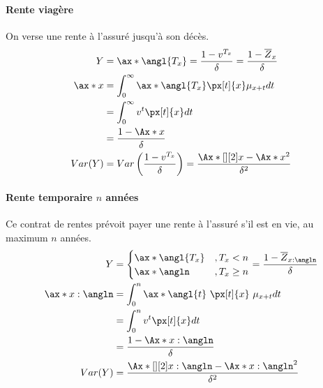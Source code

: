 \documentclass[10pt, french]{article}
\begin{document}
\begin{multicols*}{3}
\paragraph{Rente viagère} On verse une rente à l'assuré jusqu'à son décès. 
\begin{align*}
Y	&  = \ax*{\angl{T_{x}}} = \frac{1-v^{T_x}}{\delta} = \frac{1 -\overline{Z}_x}{\delta} \\
\ax*{x} & = \int_{0}^{\infty}  \ax*{\angl{T_{x}}}  \px[t]{x} \mu_{x+t} dt \\
	& = \int_{0}^{\infty} v^t \px[t]{x} dt \\
	& = \frac{1 - \Ax*{x}}{\delta} \\
Var(Y)	& = Var\left( \frac{1- v^{T_x}}{\delta} \right) =  \frac{\Ax*[][2]{x} - \Ax*{x}^2}{\delta^2}
\end{align*}

\paragraph{Rente temporaire $n$ années} Ce contrat de rentes prévoit payer une rente à l'assuré s'il est en vie, au maximum $n$ années.
\begin{align*}
Y & = \begin{cases}
\ax*{\angl{T_x}}	& , T_x < n \\
\ax*{\angln}			& , T_x \geq n \\
\end{cases} = \frac{1  - \overline{Z}_{x:\angln}}{\delta} \\
\ax*{x:\angln}	& = \int_{0}^{n} \ax*{\angl{t}} \  \px[t]{x} \  \mu_{x+t} dt \\
	& = \int_{0}^{n} v^t \px[t]{x} dt \\
	& = \frac{1 - \Ax*{x:\angln}}{\delta} \\
Var(Y)	& = \frac{\Ax*[][2]{x:\angln} - \Ax*{x:\angln}^2}{\delta^2} \\	
 \end{align*}



\end{multicols*}
\end{document}
